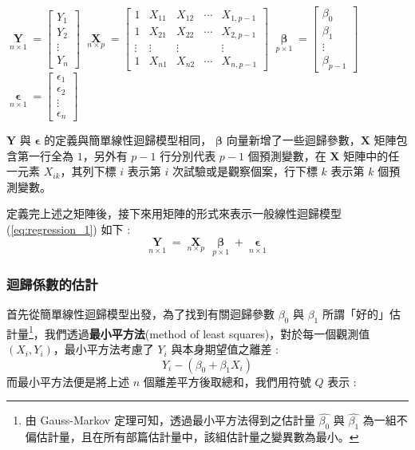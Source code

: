 $\mathop{\mathbf{Y}} \limits_{n \times 1} = \begin{bmatrix}
Y_1 \\
Y_2 \\
\vdots \\
Y_n
\end{bmatrix}$ \quad $\mathop{\mathbf{X}} \limits_{n \times p} = \begin{bmatrix}
1 & X_{11} & X_{12} & \cdots & X_{1, p-1}\\
1 & X_{21} & X_{22} & \cdots & X_{2, p-1}\\
\vdots  & \vdots & \vdots & & \vdots\\
1 & X_{n1} & X_{n2} & \cdots & X_{n, p-1}
\end{bmatrix}$ \quad $\mathop{\boldsymbol{\beta}} \limits_{p \times 1} = \begin{bmatrix}
\beta_0\\
\beta_1\\
\vdots \\
\beta_{p-1}
\end{bmatrix}$ \quad $\mathop{\boldsymbol{\epsilon}} \limits_{n \times 1} = \begin{bmatrix}
\epsilon_1\\
\epsilon_2\\
\vdots \\
\epsilon_n
\end{bmatrix}$

\bigskip
$\mathbf{Y}$ 與 $\boldsymbol{\epsilon}$ 的定義與簡單線性迴歸模型相同， $\boldsymbol{\beta}$ 向量新增了一些迴歸參數，$\mathbf{X}$ 矩陣包含第一行全為 $1$，另外有 $p-1$ 行分別代表 $p-1$ 個預測變數，在 $\mathbf{X}$ 矩陣中的任一元素 $X_{ik}$，其列下標 $i$ 表示第 $i$ 次試驗或是觀察個案，行下標 $k$ 表示第 $k$ 個預測變數。

定義完上述之矩陣後，接下來用矩陣的形式來表示一般線性迴歸模型 (\ref{eq:regression_1}) 如下 :
\[\mathop{\mathbf{Y}} \limits_{n \times 1} = \mathop{\mathbf{X}} \limits_{n \times p}\,\mathop{\boldsymbol{\beta}} \limits_{p \times 1} + \mathop{\boldsymbol{\epsilon}} \limits_{n \times 1}\]

\subsubsection{迴歸係數的估計}

首先從簡單線性迴歸模型出發，為了找到有關迴歸參數 $\beta_0$ 與 $\beta_1$ 所謂「好的」估計量\footnote{由 Gauss-Markov 定理可知，透過最小平方法得到之估計量 $\hat{\beta_0}$ 與 $\hat{\beta_1}$ 為一組不偏估計量，且在所有部篇估計量中，該組估計量之變異數為最小。}，我們透過\textbf{最小平方法}(method of least squares)，對於每一個觀測值 $(X_i, Y_i)$，最小平方法考慮了 $Y_i$ 與本身期望值之離差 :
\[Y_i - (\beta_0 + \beta_1 X_i)\]
而最小平方法便是將上述 $n$ 個離差平方後取總和，我們用符號 $Q$ 表示 :

